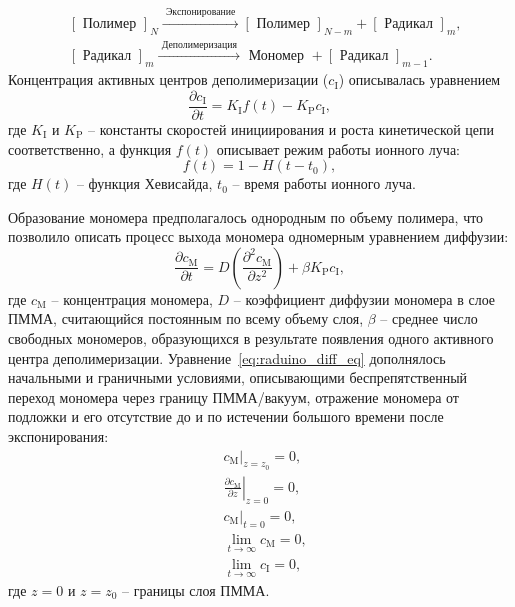 \begin{equation}
	\begin{aligned}
		&{[\text { Полимер }]_N \stackrel{\text { Экспонирование }}{\longrightarrow}[\text { Полимер }]_{N-m}+[\text { Радикал }]_m,} \\
		&{[\text { Радикал }]_m \stackrel{\text { Деполимеризация }}{\longrightarrow} \text { Мономер }+[\text { Радикал }]_{m-1} .}
	\end{aligned}
\end{equation}
Концентрация активных центров деполимеризации ($c_\mathrm{I}$) описывалась уравнением
\begin{equation}
	\frac{\partial c_\mathrm{I}}{\partial t} = K_\mathrm{I} f(t) - K_\mathrm{P} c_\mathrm{I},
\end{equation}
где $K_\mathrm{I}$ и $K_\mathrm{P}$ -- константы скоростей инициирования и роста кинетической цепи соответственно, а функция $f(t)$ описывает режим работы ионного луча:
\begin{equation}
	f(t) = 1 - H(t - t_0),
\end{equation}
где $H(t)$ -- функция Хевисайда,  $t_0$ -- время работы ионного луча.

Образование мономера предполагалось однородным по объему полимера, что позволило описать процесс выхода мономера одномерным уравнением диффузии:
\begin{equation} \label{eq:raduino_diff_eq}
	\frac{\partial c_\mathrm{M}}{\partial t} = D\left(\frac{\partial^2 c_\mathrm{M}}{\partial z^2}\right) + \beta K_\mathrm{P} c_\mathrm{I},
\end{equation}
где $c_\mathrm{M}$ -- концентрация мономера, $D$ -- коэффициент диффузии мономера в слое ПММА, считающийся постоянным по всему объему слоя, $\beta$ -- среднее число свободных мономеров, образующихся в результате появления одного активного центра деполимеризации. Уравнение~\ref{eq:raduino_diff_eq} дополнялось начальными и граничными условиями, описывающими беспрепятственный переход мономера через границу ПММА/вакуум, отражение мономера от подложки и его отсутствие до и по истечении большого времени после экспонирования:
\begin{equation} \label{eq:diff_eq_conditions}
	\begin{aligned}
		&\left.c_\mathrm{M}\right|_{z=z_0} = 0, \\
		&\left.\frac{\partial c_\mathrm{M}}{\partial z}\right|_{z=0} = 0, \\
		&\left.c_\mathrm{M}\right|_{t=0} = 0, \\
		&\lim _{t \rightarrow \infty} c_\mathrm{M} = 0, \\
		&\lim _{t \rightarrow \infty} c_\mathrm{I} = 0,
	\end{aligned}
\end{equation}
где $z=0$ и $z=z_0$ -- границы слоя ПММА.

